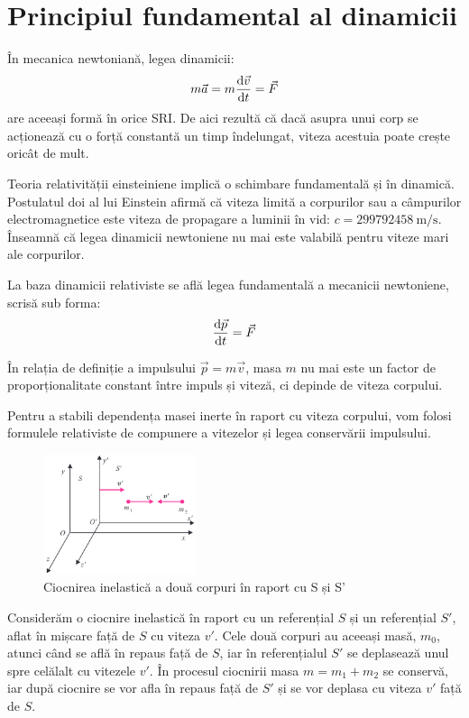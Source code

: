 \section{Principiul fundamental al dinamicii}

În mecanica newtoniană, legea dinamicii:
\[ m\vec{a} = m\frac{\mathrm{d}\vec{v}}{\mathrm{d}t} = \vec{F} \]
are aceeași formă în orice SRI. De aici rezultă că dacă asupra unui corp se
acționează cu o forță constantă un timp îndelungat, viteza acestuia poate
crește oricât de mult.

Teoria relativității einsteiniene implică o schimbare fundamentală și în
dinamică. Postulatul doi al lui Einstein afirmă că viteza limită a corpurilor
sau a câmpurilor electromagnetice este viteza de propagare a luminii în vid:
\( c = 299792458 ~ \mathrm{m/s} \).
Înseamnă că legea dinamicii newtoniene nu mai este valabilă pentru viteze mari
ale corpurilor.

La baza dinamicii relativiste se află legea fundamentală a mecanicii newtoniene,
scrisă sub forma:
\[ \frac{\mathrm{d}\vec{p}}{\mathrm{d}t} = \vec{F} \]

În relația de definiție a impulsului \( \vec{p} = m\vec{v} \), masa $m$ nu mai
este un factor de proporționalitate constant între impuls și viteză, ci depinde
de viteza corpului.

Pentru a stabili dependența masei inerte în raport cu viteza corpului, vom folosi
formulele relativiste de compunere a vitezelor și legea conservării impulsului.

\parbreak

\begin{figure}
    \centering
    \includegraphics[width=0.4\textwidth]{fig/ciocnire}
    \caption{Ciocnirea inelastică a două corpuri în raport cu S și S'}
\end{figure}

Considerăm o ciocnire inelastică în raport cu un referențial $S$ și un
referențial $S'$, aflat în mișcare față de $S$ cu viteza $v'$. Cele două
corpuri au aceeași masă, $m_0$, atunci când se află în repaus față de $S$, iar în
referențialul $S'$ se deplasează unul spre celălalt cu vitezele $v'$. În
procesul ciocnirii masa \( m = m_1 + m_2 \) se conservă, iar după ciocnire
se vor afla în repaus față de $S'$ și se vor deplasa cu viteza $v'$ față de
$S$.

